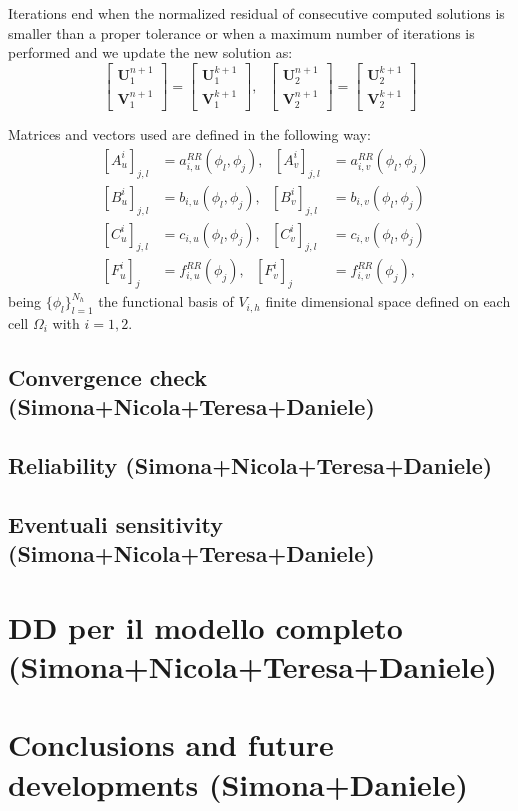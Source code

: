 \documentclass[a4paper]{siamart190516}
\begin{document}
Iterations end when the normalized residual of consecutive computed solutions is smaller than a proper tolerance or when a maximum number of iterations is performed and we update the new solution as:
 $$\begin{bmatrix} \mathbf{U}_1^{n+1} \\ \mathbf{V}_1^{n+1} \end{bmatrix} = \begin{bmatrix} \mathbf{U}_1^{k+1} \\ \mathbf{V}_1^{k+1} \end{bmatrix}, \ \ \ \begin{bmatrix} \mathbf{U}_2^{n+1} \\ \mathbf{V}_2^{n+1} \end{bmatrix} = \begin{bmatrix} \mathbf{U}_2^{k+1} \\ \mathbf{V}_2^{k+1} \end{bmatrix}$$

Matrices and vectors used are defined in the following way:
\begin{equation}
    \begin{aligned}
    & \left[ A_u^i\right]_{j,l} & = a_{i,u}^{RR}(\phi_l, \phi_j), \ \ \ \left[ A_v^i\right]_{j,l} & = a_{i,v}^{RR}(\phi_l, \phi_j) \\
    & \left[ B_u^i\right]_{j,l} & = b_{i,u}(\phi_l, \phi_j), \ \ \ \left[ B_v^i\right]_{j,l} & = b_{i,v}(\phi_l, \phi_j)\\
    & \left[ C_u^i\right]_{j,l} & = c_{i,u}(\phi_l, \phi_j),\ \ \ \left[ C_v^i\right]_{j,l} & = c_{i,v}(\phi_l, \phi_j)\\
    & \left[F_u^i\right]_{j} & = f_{i,u}^{RR}(\phi_j), \ \ \
    \left[F_v^i\right]_{j} & = f_{i,v}^{RR}(\phi_j),
    \end{aligned}
\end{equation}
being $\{\phi_l\}_{l = 1}^{N_h}$ the functional basis of $V_{i,h}$ finite dimensional space defined on each cell $\Omega_i$ with $i =1,2$.

\subsection{Convergence check (Simona+Nicola+Teresa+Daniele)}
\subsection{Reliability (Simona+Nicola+Teresa+Daniele)}
\subsection{Eventuali sensitivity (Simona+Nicola+Teresa+Daniele)}

\section{DD per il modello completo (Simona+Nicola+Teresa+Daniele)}

\section{Conclusions and future developments (Simona+Daniele)}








\end{document}
